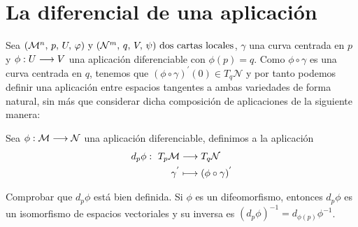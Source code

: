 \section{La diferencial de una aplicación}\label{subsec:diferencial-aplicacion}
Sea $(\mathcal{M}^n,\thinspace p,\thinspace U,\thinspace\varphi)\textmd{ y } (\mathcal{N}^m,\thinspace q,\thinspace V,\thinspace\psi)\textmd{ dos cartas locales}$, $\gamma$ una curva centrada en $p$ y $\phi:U\longrightarrow V$ una aplicación
diferenciable con $\phi(p)=q$.
Como $\phi\circ\gamma$ es una curva centrada en $q$, tenemos que $(\phi\circ\gamma)^{'}(0)\in T_q\mathcal{N}$ y por
tanto podemos definir una aplicación entre espacios tangentes a ambas variedades de forma natural, sin
más que considerar dicha composición de aplicaciones de la siguiente manera:
\begin{definition}
  Sea $\phi:\mathcal{M}\longrightarrow \mathcal{N}$ una aplicación diferenciable, definimos  a la aplicación
  \begin{equation*}
    \begin{alignedat}{1}
      d_p\phi:\ T_p\mathcal{M} & \longrightarrow T_q\mathcal{N} \\ \gamma^{'} & \longmapsto (\phi\circ\gamma)^{'}
    \end{alignedat}
  \end{equation*}
\end{definition}

\begin{exercise}
  Comprobar que $d_p\phi$ está bien definida.
  Si $\phi$ es un difeomorfismo, entonces $d_p\phi$ es
  un isomorfismo de espacios vectoriales y su inversa es $(d_p\phi)^{-1}=d_{\phi(p)}\phi^{-1}$.
\end{exercise}
